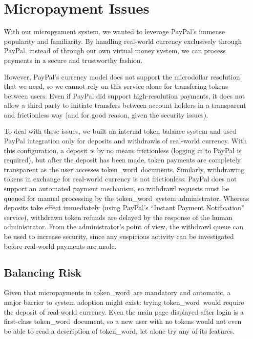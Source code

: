 \documentclass{acm_proc_article-sp}
\newcommand{\tw}{token\_word}
\begin{document}


\section{Micropayment Issues}
With our micropyament system, we wanted to leverage PayPal's \cite{paypal} immense popularity and familiarity.
By handling real-world currency exclusively through PayPal, instead of through our own virtual money system, we can process payments in a secure and trustworthy fashion.

However, PayPal's currency model does not support the microdollar resolution that we need, so we cannot rely on this service alone for transfering tokens between users.
Even if PayPal did support high-resolution payments, it does not allow a third party to initiate transfers between account holders in a transparent and frictionless way (and for good reason, given the security issues).

To deal with these issues, we built an internal token balance system and used PayPal integration only for deposits and withdrawls of real-world currency.
With this configuration, a deposit is by no means frictionless (logging in to PayPal is required), but after the deposit has been made, token payments are completely transparent as the user accesses \tw \  documents.
Similarly, withdrawing tokens in exchange for real-world currency is not frictionless: 
PayPal does not support an automated payment mechanism, so withdrawl requests must be queued for manual processing by the \tw \  system administrator.
Whereas deposits take effect immediately (using PayPal's ``Instant Payment Notification'' service), withdrawn token refunds are delayed by the response of the human administrator.
From the administrator's point of view, the withdrawl queue can be used to increase security, since any suspicious activity can be investigated before real-world payments are made.  

\subsection{Balancing Risk}
Given that micropayments in \tw \  are mandatory and automatic, a major barrier to system adoption might exist:  trying \tw \  would require the deposit of real-world currency.
Even the main page displayed after login is a first-class \tw \  document, so a new user with no tokens would not even be able to read a description of \tw, let alone try any of its features.
\end{document}
